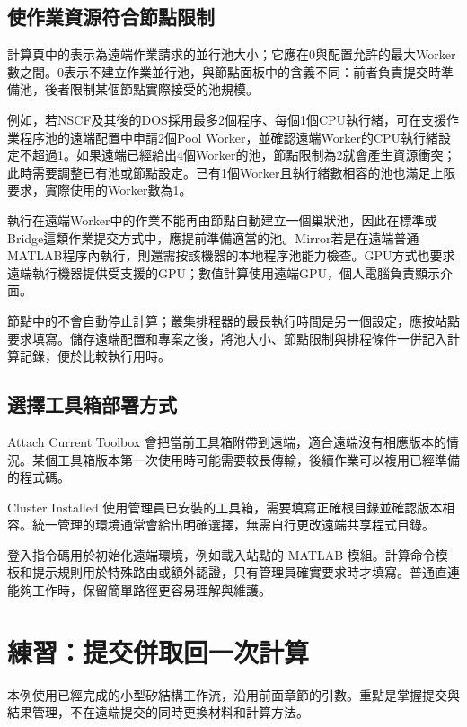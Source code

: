 \subsection{使作業資源符合節點限制}

計算頁中的表示為遠端作業請求的並行池大小；它應在0與配置允許的最大Worker數之間。0表示不建立作業並行池，與節點面板中的含義不同：前者負責提交時準備池，後者限制某個節點實際接受的池規模。

例如，若NSCF及其後的DOS採用最多2個程序、每個1個CPU執行緒，可在支援作業程序池的遠端配置中申請2個Pool Worker，並確認遠端Worker的CPU執行緒設定不超過1。如果遠端已經給出4個Worker的池，節點限制為2就會產生資源衝突；此時需要調整已有池或節點設定。已有1個Worker且執行緒數相容的池也滿足上限要求，實際使用的Worker數為1。

執行在遠端Worker中的作業不能再由節點自動建立一個巢狀池，因此在標準或Bridge這類作業提交方式中，應提前準備適當的池。Mirror若是在遠端普通MATLAB\regmark{}程序內執行，則還需按該機器的本地程序池能力檢查。GPU方式也要求遠端執行機器提供受支援的GPU；數值計算使用遠端GPU，個人電腦負責顯示介面。

節點中的不會自動停止計算；叢集排程器的最長執行時間是另一個設定，應按站點要求填寫。儲存遠端配置和專案之後，將池大小、節點限制與排程條件一併記入計算記錄，便於比較執行用時。


\subsection{選擇工具箱部署方式}

Attach Current Toolbox 會把當前工具箱附帶到遠端，適合遠端沒有相應版本的情況。某個工具箱版本第一次使用時可能需要較長傳輸，後續作業可以複用已經準備的程式碼。

Cluster Installed 使用管理員已安裝的工具箱，需要填寫正確根目錄並確認版本相容。統一管理的環境通常會給出明確選擇，無需自行更改遠端共享程式目錄。

登入指令碼用於初始化遠端環境，例如載入站點的 MATLAB\regmark{} 模組。計算命令模板和提示規則用於特殊路由或額外認證，只有管理員確實要求時才填寫。普通直連能夠工作時，保留簡單路徑更容易理解與維護。

\section{練習：提交併取回一次計算}

本例使用已經完成的小型矽結構工作流，沿用前面章節的引數。重點是掌握提交與結果管理，不在遠端提交的同時更換材料和計算方法。

